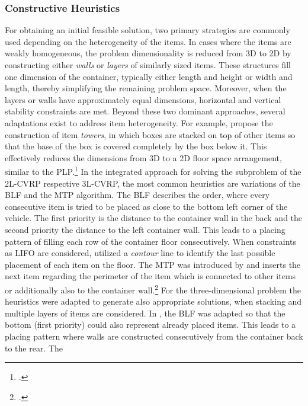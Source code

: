 \subsubsection{Constructive Heuristics}
For obtaining an initial feasible solution, two primary strategies are commonly
used depending on the heterogeneity of the items. In cases where the items are weakly homogeneous,
the problem dimensionality is reduced from 3D to 2D by constructing either
\textit{walls} or \textit{layers} of similarly sized items. These structures fill one
dimension of the container, typically either length and height or width and length, thereby
simplifying the remaining problem space. Moreover, when the layers or walls have approximately
equal dimensions, horizontal and vertical stability constraints are met.
Beyond these two dominant approaches, several adaptations exist to address item heterogeneity.
For example, \textcite{gehring_genetic_1997} propose the construction of item
\textit{towers}, in which boxes are stacked on top of other items so that the base of the box is covered completely
by the box below it. This effectively reduces the dimensions from 3D to a 2D floor space arrangement,
similar to the \gls{PLP}.\footcite[cf.][pp. 402--406]{gehring_genetic_1997}
In the integrated approach for solving the subproblem of the \gls{2L-CVRP} respective \gls{3L-CVRP},
the most common heuristics are variations of the \gls{BLF}
and the \gls{MTP} algorithm. The \gls{BLF} describes the order, where
every consecutive item is tried to be placed as close to the bottom left corner of the vehicle. The
first priority is the distance to the container wall in the back and the second priority the distance
to the left container wall. This leads to a placing pattern of filling each row of the container floor
consecutively.
When constraints as \gls{LIFO} are considered, \cite{iori_exact_2007} utilized a \textit{contour} line
to identify the last possible placement of each item on the floor. The \gls{MTP} was introduced by
\cite{zachariadis_guided_2009} and inserts the next item regarding the perimeter of the item which is connected
to other items or additionally also to the container wall.\footcite[cf.][p. 732f]{zachariadis_guided_2009}
For the three-dimensional problem the heuristics were adapted to generate also appropriate solutions, when
stacking and multiple layers of items are considered. In \cite{gendreau_tabu_2006}, the \gls{BLF} was
adapted so that the bottom (first priority) could also represent already placed items. This leads
to a placing pattern where walls are constructed consecutively from the container back to the rear. The
